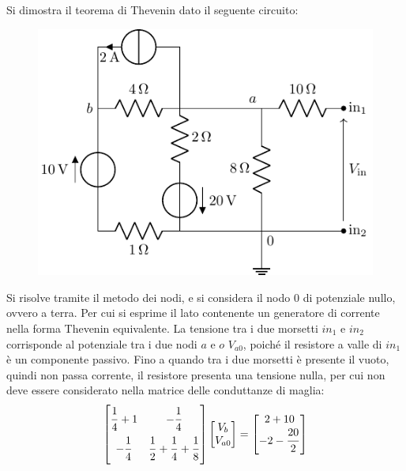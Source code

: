 \documentclass{article}
\numberwithin{equation}{subsection}
\begin{document}
Si dimostra il teorema di Thevenin dato il seguente circuito:
\begin{figure}[H]%
    \centering
    \includegraphics{circuito-8.pdf}%
    \label{fig:circuito-8}
\end{figure}
Si risolve tramite il metodo dei nodi, e si considera il nodo $0$ di potenziale nullo, ovvero a terra. Per cui si esprime il lato contenente un generatore di corrente nella 
forma Thevenin equivalente. 
La tensione tra i due morsetti $in_1$ e $in_2$ corrisponde al potenziale tra i due nodi $a$ e $o$ $V_{a0}$, poiché il resistore a valle di $in_1$ è un componente passivo. 
Fino a quando tra i due morsetti è presente il vuoto, quindi non passa corrente, il resistore presenta una tensione nulla, per cui non deve essere considerato nella matrice 
delle conduttanze di maglia:  
\begin{gather*}
    \begin{bmatrix}
        \displaystyle\frac{\strut 1}{\strut 4}+1&-\displaystyle\frac{\strut 1}{\strut 4}\\
        \displaystyle-\frac{\strut 1}{\strut 4}&\displaystyle\frac{\strut 1}{\strut 2}+\frac{\strut 1}{\strut 4}+\frac{\strut 1}{\strut 8}
    \end{bmatrix}\begin{bmatrix}
        V_b\\
        V_{a0}
    \end{bmatrix}=\begin{bmatrix}
        2+10\\
        -2-\displaystyle\frac{\strut 20}{\strut 2}
    \end{bmatrix}
\end{gather*}
\end{document}
